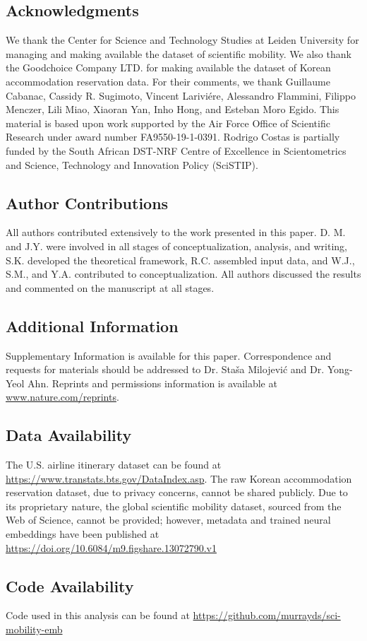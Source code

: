 \documentclass[12pt]{article} %
\begin{document}
%
%
\subsection*{Acknowledgments}
We thank the Center for Science and Technology Studies at Leiden University for managing and making available the dataset of scientific mobility. We also thank the  Goodchoice Company LTD. for making available the dataset of Korean accommodation reservation data.
For their comments, we thank Guillaume Cabanac, Cassidy R. Sugimoto, Vincent Lariviére, Alessandro Flammini, Filippo Menczer, Lili Miao, Xiaoran Yan, Inho Hong, and Esteban Moro Egido.
This material is based upon work supported by the Air Force Office of Scientific Research under award number FA9550-19-1-0391.
Rodrigo Costas is partially funded by the South African DST-NRF Centre of Excellence in Scientometrics and Science, Technology and Innovation Policy (SciSTIP).


%
%
\subsection*{Author Contributions}
All authors contributed extensively to the work presented in this paper.
D. M. and J.Y. were involved in all stages of conceptualization, analysis, and writing, S.K. developed the theoretical framework, R.C. assembled input data, and W.J., S.M., and Y.A. contributed to conceptualization.
All authors discussed the results and commented on the manuscript at all stages.


%
%
\subsection*{Additional Information}
Supplementary Information is available for this paper.
Correspondence and requests for materials should be addressed to Dr. Staša Milojević and Dr. Yong-Yeol Ahn.
Reprints and permissions information is available at
\url{www.nature.com/reprints}.


\subsection*{Data Availability}
The U.S. airline itinerary dataset can be found at \url{https://www.transtats.bts.gov/DataIndex.asp}.
The raw Korean accommodation reservation dataset, due to privacy concerns, cannot be shared publicly.
Due to its proprietary nature, the global scientific mobility dataset, sourced from the Web of Science, cannot be provided;
however, metadata and trained neural embeddings have been published at \url{https://doi.org/10.6084/m9.figshare.13072790.v1}

\subsection*{Code Availability}
Code used in this analysis can be found at \url{https://github.com/murrayds/sci-mobility-emb}


\printbibliography{}
\end{document}
